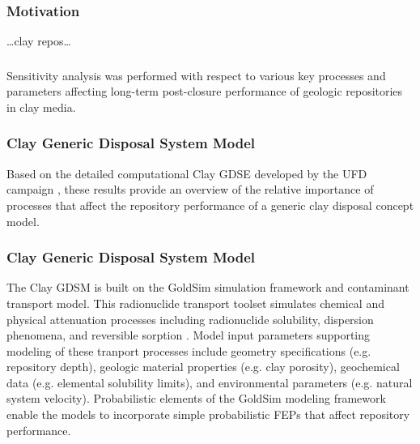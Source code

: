 

\begin{frame}[c]
  \frametitle{Motivation}
  \ldots clay repos\ldots 
\end{frame}

\begin{frame}[c]
  \frametitle{}
Sensitivity analysis was performed with respect to various key processes and 
parameters affecting long-term post-closure performance of geologic repositories 
in clay media. 
\end{frame}

\begin{frame}[c]
  \frametitle{Clay Generic Disposal System Model}
Based on the detailed computational Clay 
\gls{GDSE} developed by the \gls{UFD} campaign \cite{clayton_generic_2011}, 
these results provide an overview of the relative importance of processes 
that affect the repository performance of a generic clay disposal concept model. 
\end{frame}


\begin{frame}[c]
  \frametitle{Clay Generic Disposal System Model}
The Clay \gls{GDSM} is built on the GoldSim simulation framework and contaminant 
transport model.  This radionuclide transport toolset simulates chemical and 
physical attenuation processes including radionuclide solubility, dispersion 
phenomena, and reversible sorption \cite{golder_goldsim_2010, 
golder_goldsim_ct_2010}. Model input parameters supporting modeling of these 
tranport 
processes include geometry specifications (e.g. repository depth), geologic 
material properties (e.g. clay porosity), geochemical data 
(e.g. elemental solubility limits), and environmental parameters (e.g. natural 
system velocity). Probabilistic elements of the GoldSim modeling 
framework enable the models to incorporate simple probabilistic \gls{FEPs} that 
affect repository performance.
\end{frame}


